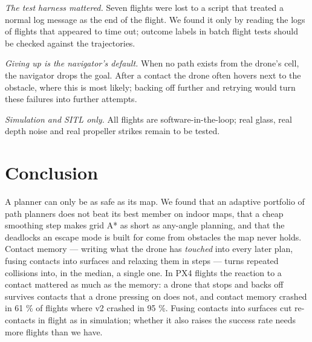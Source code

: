 \documentclass[
]{article}
\begin{document}
\emph{The test harness mattered.} Seven flights were lost to a script
that treated a normal log message as the end of the flight. We found it
only by reading the logs of flights that appeared to time out; outcome
labels in batch flight tests should be checked against the trajectories.

\emph{Giving up is the navigator's default.} When no path exists from
the drone's cell, the navigator drops the goal. After a contact the
drone often hovers next to the obstacle, where this is most likely;
backing off further and retrying would turn these failures into further
attempts.

\emph{Simulation and SITL only.} All flights are software-in-the-loop;
real glass, real depth noise and real propeller strikes remain to be
tested.

\section{Conclusion}\label{conclusion}

A planner can only be as safe as its map. We found that an adaptive
portfolio of path planners does not beat its best member on indoor maps,
that a cheap smoothing step makes grid A* as short as any-angle
planning, and that the deadlocks an escape mode is built for come from
obstacles the map never holds. Contact memory --- writing what the drone
has \emph{touched} into every later plan, fusing contacts into surfaces
and relaxing them in steps --- turns repeated collisions into, in the
median, a single one. In PX4 flights the reaction to a contact mattered
as much as the memory: a drone that stops and backs off survives
contacts that a drone pressing on does not, and contact memory crashed
in 61 \% of flights where v2 crashed in 95 \%. Fusing contacts into
surfaces cut re-contacts in flight as in simulation; whether it also
raises the success rate needs more flights than we have.

\printbibliography[title=References]
\end{document}
